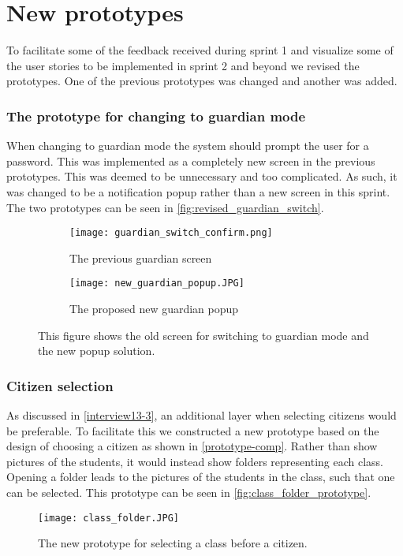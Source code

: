 \section{New prototypes}
To facilitate some of the feedback received during sprint 1 and visualize some of the user stories to be implemented in sprint 2 and beyond we revised the prototypes.
One of the previous prototypes was changed and another was added.

\subsubsection{The prototype for changing to guardian mode}
When changing to guardian mode the system should prompt the user for a password.
This was implemented as a completely new screen in the previous prototypes.
This was deemed to be unnecessary and too complicated.
As such, it was changed to be a notification popup rather than a new screen in this sprint.
The two prototypes can be seen in \autoref{fig:revised_guardian_switch}.

\begin{figure}[H]
    \begin{subfigure}{0.5\textwidth}
    \texttt{[image: guardian\_switch\_confirm.png]} 
    \caption{The previous guardian screen}
    \label{fig:previous_guardian_screen}
    \end{subfigure}
    \begin{subfigure}{0.5\textwidth}
        \texttt{[image: new\_guardian\_popup.JPG]}
    \caption{The proposed new guardian popup}
    \label{fig:new_guardian_popup}
    \end{subfigure} 
    \caption{This figure shows the old screen for switching to guardian mode and the new popup solution.}
    \label{fig:revised_guardian_switch}
\end{figure}

\subsubsection{Citizen selection}
As discussed in \autoref{interview13-3}, an additional layer when selecting citizens would be preferable.
To facilitate this we constructed a new prototype based on the design of choosing a citizen as shown in \autoref{prototype-comp}.
Rather than show pictures of the students, it would instead show folders representing each class.
Opening a folder leads to the pictures of the students in the class, such that one can be selected.
This prototype can be seen in \autoref{fig:class_folder_prototype}.

\begin{figure}[h]
    \centering
    \texttt{[image: class\_folder.JPG]}
    \caption{The new prototype for selecting a class before a citizen.}
    \label{fig:class_folder_prototype}
  \end{figure}
